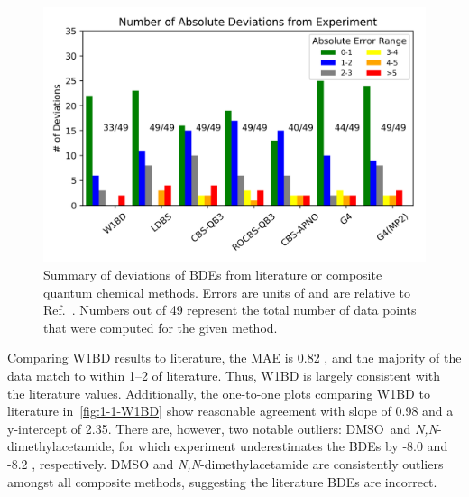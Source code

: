 \begin{figure}[!htbp]
  \centering
  \includegraphics[width=\textwidth]{figures/bde-barchart}
  \caption[Summary of deviations of BDEs from literature for composite quantum chemical methods.]{Summary of deviations of BDEs from literature or composite quantum chemical methods. Errors are units of \kcalmol and are relative to Ref.~\protect{}. Numbers out of 49 represent the total number of data points that were computed for the given method.}
  \label{fig:maebarchart}
\end{figure}

Comparing W1BD results to literature, the MAE is 0.82 \kcalmol, and the majority of the data match to within 1--2 \kcalmol of literature. Thus, W1BD is largely consistent with the literature values. Additionally, the one-to-one plots comparing W1BD to literature in~\ref{fig:1-1-W1BD} show reasonable agreement with slope of 0.98 and a y-intercept of 2.35. There are, however, two notable outliers: DMSO\footnotemark\ and \emph{N,N}-dimethylacetamide, for which experiment underestimates the BDEs by -8.0 and -8.2 \kcalmol, respectively. DMSO and \emph{N,N}-dimethylacetamide are consistently outliers amongst all composite methods, suggesting the literature BDEs are incorrect.



